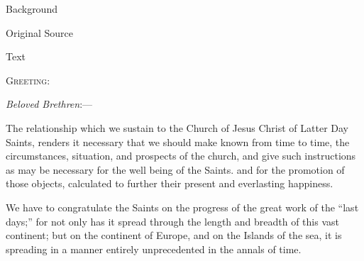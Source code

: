 			\begin{description}
				\item[Background]
			\end{description}
			
			
			\begin{description}
				\item[Original Source]
			\end{description}
			
			
			\begin{description}
				\item[Text]
			\end{description}
			

				\textsc{Greeting:}

				\textit{Beloved Brethren}:---

				The relationship which we sustain to the Church of Jesus Christ of Latter Day Saints, renders it necessary that we should make known from time to time, the circumstances, situation, and prospects of the church, and give such instructions as may be necessary for the well being of the Saints. and for the promotion of those objects, calculated to further their present and everlasting happiness.

				We have to congratulate the Saints on the progress of the great work of the ``last days;'' for not only has it spread through the length and breadth of this vast continent; but on the continent of Europe, and on the Islands of the sea, it is spreading in a manner entirely unprecedented in the annals of time.


